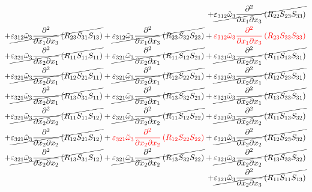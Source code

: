 \begin{equation}
\begin{split}
		+\cancel{\varepsilon_{312}\tilde{\omega}_{3}\pdv{}{x_{1}}{x_{3}}\left(R_{22}S_{23}S_{33}\right)}\\
		+\cancel{\varepsilon_{312}\tilde{\omega}_{3}\pdv{}{x_{1}}{x_{3}}\left(R_{23}S_{31}S_{13}\right)}
		+\cancel{\varepsilon_{312}\tilde{\omega}_{3}\pdv{}{x_{1}}{x_{3}}\left(R_{23}S_{32}S_{23}\right)}
		+{\color{red}\varepsilon_{312}\tilde{\omega}_{3}\pdv{}{x_{1}}{x_{3}}\left(R_{23}S_{33}S_{33}\right)}\\
		+\cancel{\varepsilon_{321}\tilde{\omega}_{3}\pdv{}{x_{2}}{x_{1}}\left(R_{11}S_{11}S_{11}\right)}
		+\cancel{\varepsilon_{321}\tilde{\omega}_{3}\pdv{}{x_{2}}{x_{1}}\left(R_{11}S_{12}S_{21}\right)}
		+\cancel{\varepsilon_{321}\tilde{\omega}_{3}\pdv{}{x_{2}}{x_{1}}\left(R_{11}S_{13}S_{31}\right)}\\
		+\cancel{\varepsilon_{321}\tilde{\omega}_{3}\pdv{}{x_{2}}{x_{1}}\left(R_{12}S_{21}S_{11}\right)}
		+\cancel{\varepsilon_{321}\tilde{\omega}_{3}\pdv{}{x_{2}}{x_{1}}\left(R_{12}S_{22}S_{21}\right)}
		+\cancel{\varepsilon_{321}\tilde{\omega}_{3}\pdv{}{x_{2}}{x_{1}}\left(R_{12}S_{23}S_{31}\right)}\\
		+\cancel{\varepsilon_{321}\tilde{\omega}_{3}\pdv{}{x_{2}}{x_{1}}\left(R_{13}S_{31}S_{11}\right)}
		+\cancel{\varepsilon_{321}\tilde{\omega}_{3}\pdv{}{x_{2}}{x_{1}}\left(R_{13}S_{32}S_{21}\right)}
		+\cancel{\varepsilon_{321}\tilde{\omega}_{3}\pdv{}{x_{2}}{x_{1}}\left(R_{13}S_{33}S_{31}\right)}\\
		+\cancel{\varepsilon_{321}\tilde{\omega}_{3}\pdv{}{x_{2}}{x_{2}}\left(R_{11}S_{11}S_{12}\right)}
		+\cancel{\varepsilon_{321}\tilde{\omega}_{3}\pdv{}{x_{2}}{x_{2}}\left(R_{11}S_{12}S_{22}\right)}
		+\cancel{\varepsilon_{321}\tilde{\omega}_{3}\pdv{}{x_{2}}{x_{2}}\left(R_{11}S_{13}S_{32}\right)}\\
		+\cancel{\varepsilon_{321}\tilde{\omega}_{3}\pdv{}{x_{2}}{x_{2}}\left(R_{12}S_{21}S_{12}\right)}
		+{\color{red}\varepsilon_{321}\tilde{\omega}_{3}\pdv{}{x_{2}}{x_{2}}\left(R_{12}S_{22}S_{22}\right)}
		+\cancel{\varepsilon_{321}\tilde{\omega}_{3}\pdv{}{x_{2}}{x_{2}}\left(R_{12}S_{23}S_{32}\right)}\\
		+\cancel{\varepsilon_{321}\tilde{\omega}_{3}\pdv{}{x_{2}}{x_{2}}\left(R_{13}S_{31}S_{12}\right)}
		+\cancel{\varepsilon_{321}\tilde{\omega}_{3}\pdv{}{x_{2}}{x_{2}}\left(R_{13}S_{32}S_{22}\right)}
		+\cancel{\varepsilon_{321}\tilde{\omega}_{3}\pdv{}{x_{2}}{x_{2}}\left(R_{13}S_{33}S_{32}\right)}\\
		+\cancel{\varepsilon_{321}\tilde{\omega}_{3}\pdv{}{x_{2}}{x_{3}}\left(R_{11}S_{11}S_{13}\right)}

\end{split}
\end{equation}
